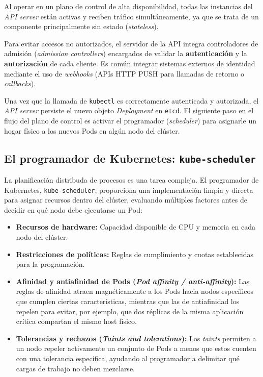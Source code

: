Al operar en un plano de control de alta disponibilidad, todas las instancias del \textit{API server} están activas y reciben tráfico simultáneamente, ya que se trata de un componente principalmente sin estado (\textit{stateless}). 

Para evitar accesos no autorizados, el servidor de la API integra controladores de admisión (\textit{admission controllers}) encargados de validar la \textbf{autenticación} y la \textbf{autorización} de cada cliente. Es común integrar sistemas externos de identidad mediante el uso de \textit{webhooks} (APIs HTTP PUSH para llamadas de retorno o \textit{callbacks}).

Una vez que la llamada de \texttt{kubectl} es correctamente autenticada y autorizada, el \textit{API server} persiste el nuevo objeto \textit{Deployment} en \texttt{etcd}. El siguiente paso en el flujo del plano de control es activar el programador (\textit{scheduler}) para asignarle un hogar físico a los nuevos Pods en algún nodo del clúster.

\subsection{El programador de Kubernetes: \texttt{kube-scheduler}}

La planificación distribuda de procesos es una tarea compleja. El programador de Kubernetes, \texttt{kube-scheduler}, proporciona una implementación limpia y directa para asignar recursos dentro del clúster, evaluando múltiples factores antes de decidir en qué nodo debe ejecutarse un Pod:

\begin{itemize}
    \item \textbf{Recursos de hardware:} Capacidad disponible de CPU y memoria en cada nodo del clúster.
    \item \textbf{Restricciones de políticas:} Reglas de cumplimiento y cuotas establecidas para la programación.
    \item \textbf{Afinidad y antiafinidad de Pods (\textit{Pod affinity / anti-affinity}):} Las reglas de afinidad atraen magnéticamente a los Pods hacia nodos específicos que cumplen ciertas características, mientras que las de antiafinidad los repelen para evitar, por ejemplo, que dos réplicas de la misma aplicación crítica compartan el mismo host físico.
    \item \textbf{Tolerancias y rechazos (\textit{Taints and tolerations}):} Los \textit{taints} permiten a un nodo repeler activamente un conjunto de Pods a menos que estos cuenten con una tolerancia específica, ayudando al programador a delimitar qué cargas de trabajo no deben mezclarse.
\end{itemize}

